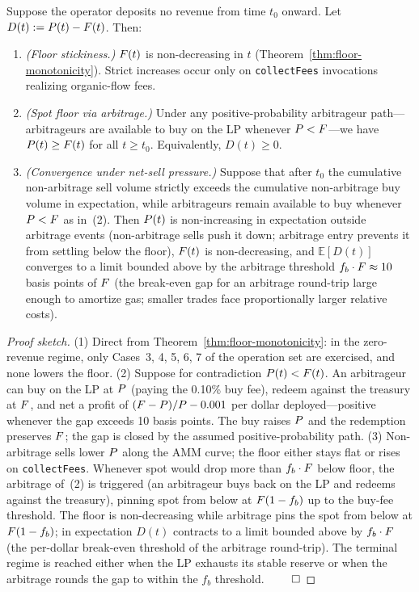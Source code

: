 \begin{theorem}
\label{thm:spot-floor-convergence}
Suppose the operator deposits no revenue from time $t_0$ onward. Let $D(t) := P(t) - F(t)$. Then:
\begin{enumerate}
\item \emph{(Floor stickiness.)} $F(t)$ is non-decreasing in $t$ (Theorem~\ref{thm:floor-monotonicity}). Strict increases occur only on \texttt{collectFees} invocations realizing organic-flow fees.
\item \emph{(Spot floor via arbitrage.)} Under any positive-probability arbitrageur path---arbitrageurs are available to buy on the LP whenever $P < F$---we have $P(t) \geq F(t)$ for all $t \geq t_0$. Equivalently, $D(t) \geq 0$.
\item \emph{(Convergence under net-sell pressure.)} Suppose that after $t_0$ the cumulative non-arbitrage sell volume strictly exceeds the cumulative non-arbitrage buy volume in expectation, while arbitrageurs remain available to buy whenever $P < F$ as in~(2). Then $P(t)$ is non-increasing in expectation outside arbitrage events (non-arbitrage sells push it down; arbitrage entry prevents it from settling below the floor), $F(t)$ is non-decreasing, and $\mathbb{E}[D(t)]$ converges to a limit bounded above by the arbitrage threshold $f_b \cdot F \approx 10$ basis points of $F$ (the break-even gap for an arbitrage round-trip large enough to amortize gas; smaller trades face proportionally larger relative costs).
\end{enumerate}
\end{theorem}

\begin{proof}[Proof sketch]
(1) Direct from Theorem~\ref{thm:floor-monotonicity}: in the zero-revenue regime, only Cases~3, 4, 5, 6, 7 of the operation set are exercised, and none lowers the floor. (2) Suppose for contradiction $P(t) < F(t)$. An arbitrageur can buy on the LP at $P$ (paying the 0.10\% buy fee), redeem against the treasury at $F$, and net a profit of $(F - P)/P - 0.001$ per dollar deployed---positive whenever the gap exceeds 10 basis points. The buy raises $P$ and the redemption preserves $F$; the gap is closed by the assumed positive-probability path. (3) Non-arbitrage sells lower $P$ along the AMM curve; the floor either stays flat or rises on \texttt{collectFees}. Whenever spot would drop more than $f_b \cdot F$ below floor, the arbitrage of~(2) is triggered (an arbitrageur buys back on the LP and redeems against the treasury), pinning spot from below at $F (1 - f_b)$ up to the buy-fee threshold. The floor is non-decreasing while arbitrage pins the spot from below at $F(1 - f_b)$; in expectation $D(t)$ contracts to a limit bounded above by $f_b \cdot F$ (the per-dollar break-even threshold of the arbitrage round-trip). The terminal regime is reached either when the LP exhausts its stable reserve or when the arbitrage rounds the gap to within the $f_b$ threshold. $\qed$
\end{proof}

